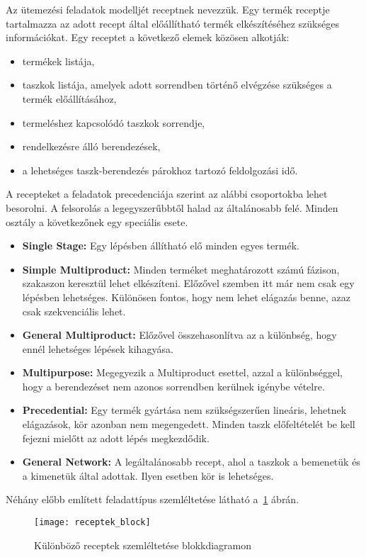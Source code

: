 Az ütemezési feladatok modelljét receptnek nevezzük. Egy termék receptje tartalmazza az adott recept által előállítható termék elkészítéséhez szükséges információkat\cite{Hegyhati}. Egy receptet a következő elemek közösen alkotják:
\begin{itemize}
  \item termékek listája,
  \item taszkok listája, amelyek adott sorrendben történő elvégzése szükséges a termék előállításához,
  \item termeléshez kapcsolódó taszkok sorrendje,
  \item rendelkezésre álló berendezések,
  \item a lehetséges taszk-berendezés párokhoz tartozó feldolgozási idő.
\end{itemize}
A recepteket a feladatok precedenciája szerint az alábbi csoportokba lehet besorolni. A felsorolás a legegyszerűbbtől halad az általánosabb felé. Minden osztály a következőnek egy speciális esete.
\begin{itemize}
	\item \textbf{Single Stage:} Egy lépésben állítható elő minden egyes termék.
	\item \textbf{Simple Multiproduct:} Minden terméket meghatározott számú fázison, szakaszon keresztül lehet elkészíteni. Előzővel szemben itt már nem csak egy lépésben lehetséges. Különösen fontos, hogy nem lehet elágazás benne, azaz csak szekvenciális lehet.
	\item \textbf{General Multiproduct:} Előzővel összehasonlítva az a különbség, hogy ennél lehetséges lépések kihagyása.
	\item \textbf{Multipurpose:} Megegyezik a Multiproduct esettel, azzal a különbséggel, hogy a berendezéset nem azonos sorrendben kerülnek igénybe vételre.
	\item \textbf{Precedential:} Egy termék gyártása nem szükségszerűen lineáris, lehetnek elágazások, kör azonban nem megengedett. Minden taszk előfeltételét be kell fejezni mielőtt az adott lépés megkezdődik. 
	\item \textbf{General Network:} A legáltalánosabb recept, ahol a taszkok a bemenetük és a kimenetük által adottak. Ilyen esetben kör is lehetséges.
\end{itemize}
Néhány előbb említett feladattípus szemléltetése látható a~\ref{receptek_block} ábrán.

\begin{figure}[H]	
\begin{center}
\texttt{[image: receptek\_block]}
\caption{Különböző receptek szemléltetése blokkdiagramon}
\label{receptek_block}
\end{center}
\end{figure}

